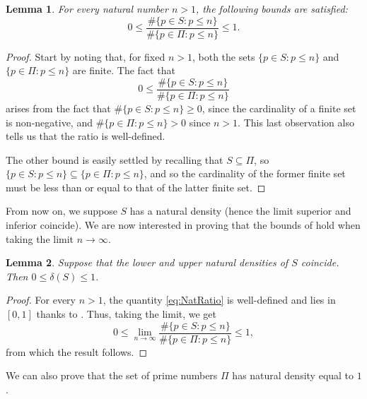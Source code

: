 \documentclass[a4paper,11pt]{article}
\theoremstyle{plain}
\newtheorem{lemma}[lemma]{Lemma}
\begin{document}
    \begin{lemma}
    \label{lemma:Nat1}
        For every natural number $n>1$, the following bounds are satisfied:
        \begin{equation}
        \label{eq:NatRatio}
            0\leq\frac{\#\{p\in S: p \leq n\}}{\#\{p\in \Pi: p \leq n\}}\leq 1.
        \end{equation}  
    \end{lemma}
    \begin{proof}
        Start by noting that, for fixed $n>1$, both the sets $\{p\in S: p \leq n\}$ and $\{p\in \Pi: p \leq n\}$ are finite. The fact that
         \begin{equation*}
            0\leq\frac{\#\{p\in S: p \leq n\}}{\#\{p\in \Pi: p \leq n\}}
        \end{equation*} 
        arises from the fact that $\#\{p\in S: p \leq n\}\geq 0$, since the cardinality of a finite set is non-negative, and $\#\{p\in \Pi: p \leq n\}>0$ since $n>1$. This last observation also tells us that the ratio is well-defined.

        The other bound is easily settled by recalling that $S\subseteq\Pi$, so $\{p\in S: p \leq n\}\subseteq\{p\in \Pi: p \leq n\}$, and so the cardinality of the former finite set must be less than or equal to that of the latter finite set.
    \end{proof}

    From now on, we suppose $S$ has a natural density (hence the limit superior and inferior coincide). We are now interested in proving that the bounds of  hold when taking the limit $n\rightarrow\infty$.

    \begin{lemma}
    \label{lemma:Nat2}
        Suppose that the lower and upper natural densities of $S$ coincide. Then $0\leq \delta(S)\leq 1$.
    \end{lemma}
    \begin{proof}
        For every $n>1$, the quantity \eqref{eq:NatRatio} is well-defined and lies in $[0,1]$ thanks to . Thus, taking the limit, we get 
        \begin{equation*}
            0\leq \lim_{n\rightarrow\infty}\frac{\#\{p\in S: p \leq n\}}{\#\{p\in \Pi: p \leq n\}}\leq 1,
        \end{equation*}
        from which the result follows.
    \end{proof}

    We can also prove that the set of prime numbers $\Pi$ has natural density equal to $1$.
\end{document}
